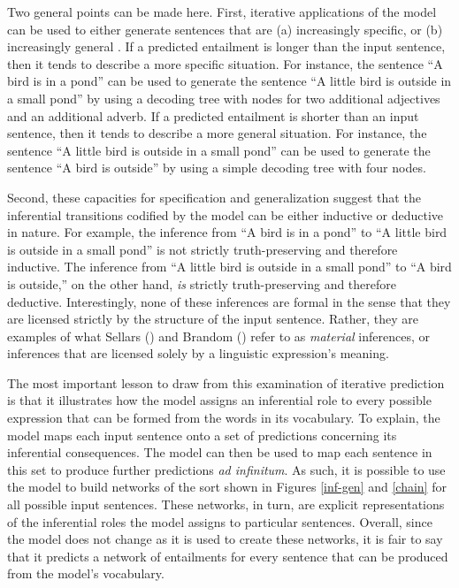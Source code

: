 \documentclass[utf8]{frontiersSCNS} %
\begin{document}
Two general points can be made here. First, iterative applications of the model can be used to either generate sentences that are (a) increasingly specific, or (b) increasingly general \citep{Kolesnyk:2016}. If a predicted entailment is longer than the input sentence, then it tends to describe a more specific situation. For instance, the sentence ``A bird is in a pond'' can be used to generate the sentence ``A little bird is outside in a small pond'' by using a decoding tree with nodes for two additional adjectives and an additional adverb. If a predicted entailment is shorter than an input sentence, then it tends to describe a more general situation. For instance, the sentence ``A little bird is outside in a small pond'' can be used to generate the sentence ``A bird is outside'' by using a simple decoding tree with four nodes. 

Second, these capacities for specification and generalization suggest that the inferential transitions codified by the model can be either inductive or deductive in nature. For example, the inference from ``A bird is in a pond'' to ``A little bird is outside in a small pond'' is not strictly truth-preserving and therefore inductive. The inference from ``A little bird is outside in a small pond'' to ``A bird is outside,'' on the other hand, \textit{is} strictly truth-preserving and therefore deductive. Interestingly, none of these inferences are formal in the sense that they are licensed strictly by the structure of the input sentence. Rather, they are examples of what Sellars (\citeyear{Sellars:1953}) and Brandom (\citeyear{Brandom:1994}) refer to as \textit{material} inferences, or inferences that are licensed solely by a linguistic expression's meaning. 

The most important lesson to draw from this examination of iterative prediction is that it illustrates how the model assigns an inferential role to every possible expression that can be formed from the words in its vocabulary. To explain, the model maps each input sentence onto a set of predictions concerning its inferential consequences. The model can then be used to map each sentence in this set to produce further predictions \textit{ad infinitum}. As such, it is possible to use the model to build networks of the sort shown in Figures \ref{inf-gen} and \ref{chain} for all possible input sentences. These networks, in turn, are explicit representations of the inferential roles the model assigns to particular sentences. Overall, since the model does not change as it is used to create these networks, it is fair to say that it predicts a network of entailments for every sentence that can be produced from the model's vocabulary.
\end{document}
